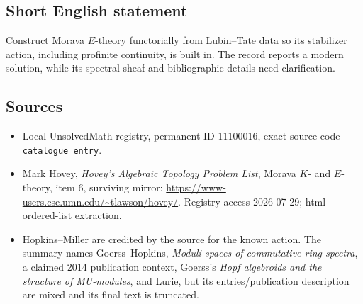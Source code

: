 \documentclass[11pt]{article}
\begin{document}
\subsection{Short English statement}
Construct Morava \(E\)-theory functorially from Lubin--Tate data so its stabilizer action, including profinite continuity, is built in. The record reports a modern solution, while its spectral-sheaf and bibliographic details need clarification.
\subsection{Sources}
\begin{itemize}
\item Local UnsolvedMath registry, permanent ID \(11100016\), exact source code \texttt{catalogue entry}.
\item Mark Hovey, \emph{Hovey's Algebraic Topology Problem List}, Morava \(K\)- and \(E\)-theory, item 6, surviving mirror: \url{https://www-users.cse.umn.edu/~tlawson/hovey/}. Registry access 2026-07-29; html-ordered-list extraction.
\item Hopkins--Miller are credited by the source for the known action. The summary names Goerss--Hopkins, \emph{Moduli spaces of commutative ring spectra}, a claimed 2014 publication context, Goerss's \emph{Hopf algebroids and the structure of MU-modules}, and Lurie, but its entries/publication description are mixed and its final text is truncated.
\end{itemize}
\end{document}

